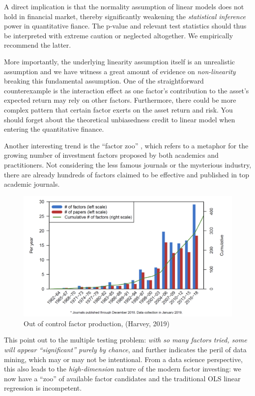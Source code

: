 \documentclass[
]{book}
\begin{document}
A direct implication is that the normality assumption of linear models does not hold in financial market, thereby significantly weakening the {\emph{statistical inference}} power in quantitative fiance. The p-value and relevant test statistics should thus be interpreted with extreme caution or neglected altogether. We empirically recommend the latter.

More importantly, the underlying linearity assumption itself is an unrealistic assumption and we have witness a great amount of evidence on {\emph{non-linearity}} breaking this fundamental assumption. One of the straightforward counterexample is the interaction effect as one factor's contribution to the asset's expected return may rely on other factors. Furthermore, there could be more complex pattern that certain factor exerts on the asset return and risk. You should forget about the theoretical unbiasedness credit to linear model when entering the quantitative finance.

Another interesting trend is the ``factor zoo'' \citep{harvey2019census}, which refers to a metaphor for the growing number of investment factors proposed by both academics and practitioners. Not considering the less famous journals or the mysterious industry, there are already hundreds of factors claimed to be effective and published in top academic journals.\\

\begin{figure}
\includegraphics[width=0.9\linewidth]{images/chapter3/factor_zoo} \caption{Out of control factor production, (Harvey, 2019)}\label{fig:unnamed-chunk-2}
\end{figure}

This point out to the multiple testing problem: \emph{with so many factors tried, some will appear ``significant'' purely by chance}, and further indicates the peril of data mining, which may or may not be intentional. From a data science perspective, this also leads to the {\emph{high-dimension}} nature of the modern factor investing: we now have a ``zoo'' of available factor candidates and the traditional OLS linear regression is incompetent.
\end{document}
